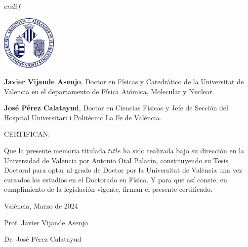 \raggedright
$endif$


\newpage
\thispagestyle{empty}
\begin{flushright}
\end{flushright}


\includegraphics[width=0.2\textwidth]{logouni} %

\vspace{4ex}

\textbf{Javier Vijande Asenjo}, Doctor en Físicas y Catedrático de la Universitat de Valencia en el departamento de Física Atómica, Molecular y Nuclear.

\vspace{3ex}

\textbf{José Pérez Calatayud}, Doctor en Ciencias Físicas y Jefe de Sección del Hospital Universitari i Politècnic La Fe de València.

\vspace{3ex}

{\Large CERTIFICAN: }

\vspace{3ex}


Que la presente memoria titulada \emph{$title$} ha
sido realizada bajo su dirección en la Universidad de Valencia por Antonio Otal Palacín, constituyendo su Tesis Doctoral para optar al grado de Doctor por la
Universitat de València una vez cursados los estudios en el Doctorado en Física. Y para
que así conste, en cumplimiento de la legislación vigente, firman el presente certificado.

\vspace{3ex}

València, Marzo de 2024

\vspace{25ex}

\begin{minipage}[t]{0.4\textwidth}
    \centering
    {\large Prof. Javier Vijande Asenjo \par}
\end{minipage}
\hfill
\begin{minipage}[t]{0.4\textwidth}
    \centering
    {\large Dr. José Pérez Calatayud \par}
\end{minipage}
\raggedright


